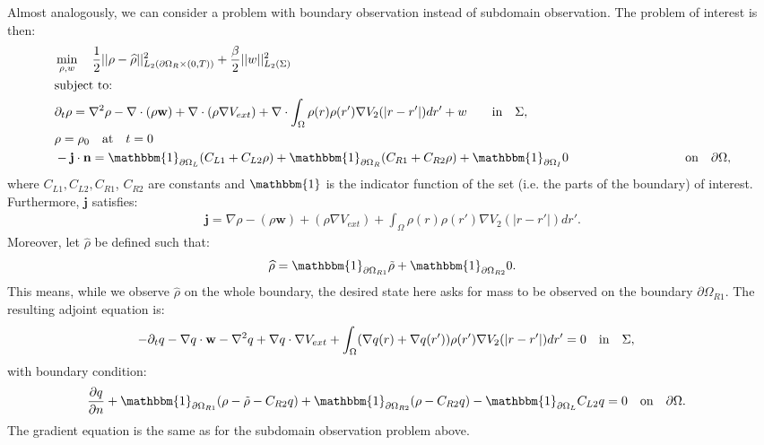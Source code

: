 
Almost analogously, we can consider a problem with boundary observation instead of subdomain observation.
The problem of interest is then:
\begin{align*}
&\min_{\rho, w} \quad \frac{1}{2}|| \rho -\widehat \rho||^2_{L_2(\partial \Omega_R \times (0,T))} + \frac{\beta}{2}||w||^2_{L_2(\Sigma)}\\
&\text{subject to:}\\
&\partial_t \rho = \nabla^2 \rho - \nabla \cdot (\rho \mathbf{w}) +\nabla \cdot (\rho \nabla V_{ext}) + \nabla \cdot \int_\Omega \rho(r) \rho(r') \nabla V_2(|r-r'|) dr' + w \quad  \quad\text{in} \quad \Sigma,\notag\\
& \rho = \rho_0 \quad \text{at} \quad t=0 \notag\\
& - \mathbf{j} \cdot \n = \mathbbm{1}_{\partial \Omega_L}( C_{L1}  + C_{L2}\rho) +\mathbbm{1}_{\partial \Omega_R} ( C_{R1}  + C_{R2}\rho) +\mathbbm{1}_{\partial \Omega_I} 0 \ \quad \qquad \qquad \qquad \quad \quad\text{on} \quad \partial \Omega, 
\end{align*}
where $C_{L1}, C_{L2}, C_{R1}$, $C_{R2}$ are constants and $\mathbbm{1}$ is the indicator function of the set (i.e. the parts of the boundary) of interest.
Furthermore, $\mathbf{j}$ satisfies:
\begin{align*}
\mathbf{j}=\nabla \rho - (\rho \mathbf{w}) +(\rho \nabla V_{ext}) +  \int_\Omega \rho(r) \rho(r') \nabla V_2(|r-r'|) dr'.
\end{align*}
Moreover, let $\widehat \rho$ be defined such that:
\begin{align*}
\widehat \rho = \mathbbm{1}_{\partial \Omega_{R1}} \tilde \rho  +\mathbbm{1}_{\partial \Omega_{R2}} 0.
\end{align*}
This means, while we observe $\widehat \rho$ on the whole boundary, the desired state here asks for mass to be observed on the boundary $\partial \Omega_{R1}$.
The resulting adjoint equation is:
\begin{align*}
- \partial_t  q  - \nabla q \cdot \mathbf{w} - \nabla^2 q \notag 
+  \nabla q \cdot \nabla V_{ext}  \notag 
+ \int_\Omega (\nabla  q(r)+\nabla  q(r')) \rho(r') \nabla V_2(|r-r'|) dr' &=0 \quad \text{in} \quad \Sigma, 
\end{align*}
with boundary condition:
\begin{align*}
\frac{\partial \Adjb }{\partial n}+ \mathbbm{1}_{\partial \Omega_{R1}}(\rho- \tilde{\rho} -C_{R2} \Adjb) + \mathbbm{1}_{\partial \Omega_{R2}} (\rho-C_{R2} \Adjb) - \mathbbm{1}_{\partial \Omega_L} C_{L2} \Adjb   &=0 \quad \text{on} \quad \partial \Omega.
\end{align*}
The gradient equation is the same as for the subdomain observation problem above.
